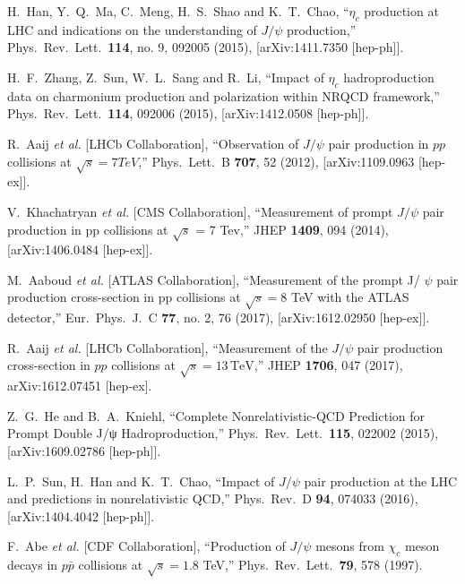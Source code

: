 \documentclass[12pt,a4paper,final]{iopart}
\begin{document}
\begin{thebibliography}{100}
  H.~Han, Y.~Q.~Ma, C.~Meng, H.~S.~Shao and K.~T.~Chao,
  ``$\eta_c$ production at LHC and indications on the understanding of $J/\psi$ production,''
  Phys.\ Rev.\ Lett.\  {\bf 114}, no. 9, 092005 (2015), [arXiv:1411.7350 [hep-ph]].
  

  H.~F.~Zhang, Z.~Sun, W.~L.~Sang and R.~Li,
  ``Impact of $\eta_c$ hadroproduction data on charmonium production and polarization within NRQCD framework,''
  Phys.\ Rev.\ Lett.\  {\bf 114}, 092006 (2015), [arXiv:1412.0508 [hep-ph]].




  R.~Aaij {\it et al.} [LHCb Collaboration],
  ``Observation of $J/\psi$ pair production in $pp$ collisions at $\sqrt{s}=7 TeV$,''
  Phys.\ Lett.\ B {\bf 707}, 52 (2012), [arXiv:1109.0963 [hep-ex]].


  V.~Khachatryan {\it et al.} [CMS Collaboration],
  ``Measurement of prompt $J/\psi$ pair production in pp collisions at $ \sqrt{s} $ = 7 Tev,''
  JHEP {\bf 1409}, 094 (2014), [arXiv:1406.0484 [hep-ex]].
 

  M.~Aaboud {\it et al.} [ATLAS Collaboration],
  ``Measurement of the prompt J/ $\psi $ pair production cross-section in pp collisions at $\sqrt{s} = 8$  TeV with the ATLAS detector,''
  Eur.\ Phys.\ J.\ C {\bf 77}, no. 2, 76 (2017), [arXiv:1612.02950 [hep-ex]].


  R.~Aaij {\it et al.} [LHCb Collaboration],
  ``Measurement of the $J/\psi$ pair production cross-section in $pp$ collisions at $\sqrt{s} = 13 \,{\mathrm{TeV}}$,''
   JHEP {\bf 1706}, 047 (2017), arXiv:1612.07451 [hep-ex].
  

  Z.~G.~He and B.~A.~Kniehl,
  ``Complete Nonrelativistic-QCD Prediction for Prompt Double J/ψ Hadroproduction,''
  Phys.\ Rev.\ Lett.\  {\bf 115}, 022002 (2015), [arXiv:1609.02786 [hep-ph]].


  L.~P.~Sun, H.~Han and K.~T.~Chao,
  ``Impact of $J/\psi$ pair production at the LHC and predictions in nonrelativistic QCD,''
  Phys.\ Rev.\ D {\bf 94}, 074033 (2016), [arXiv:1404.4042 [hep-ph]].



  F.~Abe {\it et al.} [CDF Collaboration],
  ``Production of $J/\psi$ mesons from $\chi_c$ meson decays in $p\bar{p}$ collisions at $\sqrt{s} = 1.8$ TeV,''
  Phys.\ Rev.\ Lett.\  {\bf 79}, 578 (1997).



\end{thebibliography}
\end{document}
